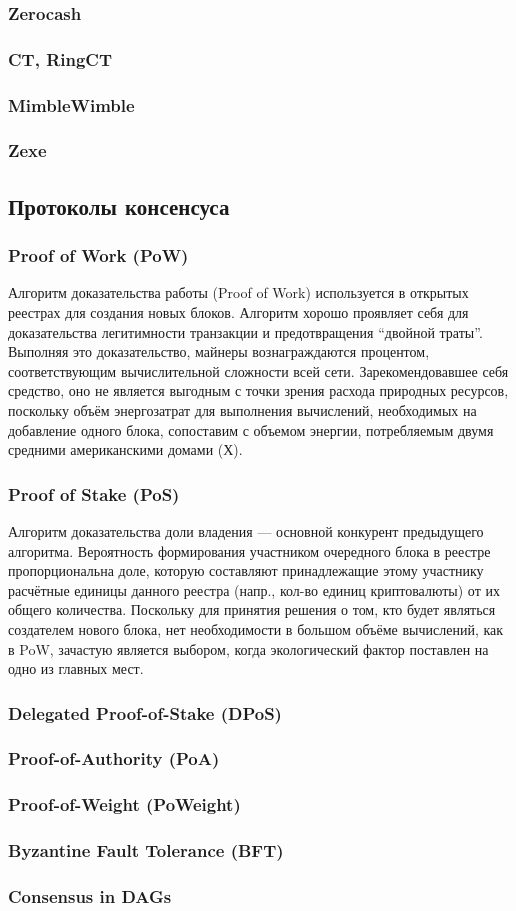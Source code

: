 \subsubsection{Zerocash}
\subsubsection{CT, RingCT}
\subsubsection{MimbleWimble}
\subsubsection{Zexe}


\subsection{Протоколы консенсуса}
\subsubsection{Proof of Work (PoW)}
Алгоритм доказательства работы (Proof of Work) используется в открытых реестрах
для создания новых блоков. Алгоритм хорошо проявляет себя для доказательства
легитимности транзакции и предотвращения ``двойной траты''.  Выполняя это
доказательство, майнеры вознаграждаются процентом, соответствующим
вычислительной сложности всей сети. Зарекомендовавшее себя средство, оно не
является выгодным с точки зрения расхода природных ресурсов, поскольку объём
энергозатрат для выполнения вычислений, необходимых на добавление одного блока,
сопоставим с объемом энергии, потребляемым двумя средними американскими домами (Х).
\subsubsection{Proof of Stake (PoS)}
Алгоритм доказательства доли владения --- основной конкурент предыдущего
алгоритма. Вероятность формирования участником очередного блока в реестре
пропорциональна доле, которую составляют принадлежащие этому участнику
расчётные единицы данного реестра (напр., кол-во единиц криптовалюты) от их
общего количества. Поскольку для принятия решения о том, кто будет являться
создателем нового блока, нет необходимости в большом объёме вычислений, как в
PoW, зачастую является выбором, когда экологический фактор поставлен на одно из
главных мест.
\subsubsection{Delegated Proof-of-Stake (DPoS)}
\subsubsection{Proof-of-Authority (PoA)}
\subsubsection{Proof-of-Weight (PoWeight)}
\subsubsection{Byzantine Fault Tolerance (BFT)}
\subsubsection{Consensus in DAGs}
